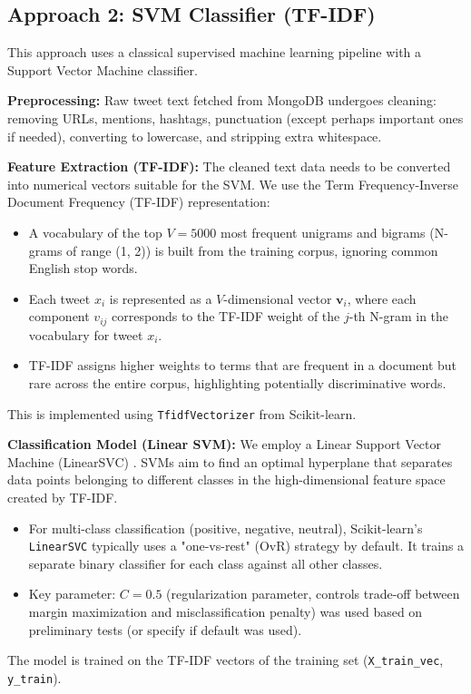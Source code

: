 \documentclass[10pt,twocolumn]{article}
\begin{document}
\subsection{Approach 2: SVM Classifier (TF-IDF)}
\label{subsec:sol_svm}

This approach uses a classical supervised machine learning pipeline with a Support Vector Machine classifier.

\textbf{Preprocessing:} Raw tweet text fetched from MongoDB undergoes cleaning: removing URLs, mentions, hashtags, punctuation (except perhaps important ones if needed), converting to lowercase, and stripping extra whitespace.

\textbf{Feature Extraction (TF-IDF):} The cleaned text data needs to be converted into numerical vectors suitable for the SVM. We use the Term Frequency-Inverse Document Frequency (TF-IDF) representation:
\begin{itemize}[itemsep=0pt, topsep=3pt]
    \item A vocabulary of the top $V=5000$ most frequent unigrams and bigrams (N-grams of range (1, 2)) is built from the training corpus, ignoring common English stop words.
    \item Each tweet $x_i$ is represented as a $V$-dimensional vector $\mathbf{v}_i$, where each component $v_{ij}$ corresponds to the TF-IDF weight of the $j$-th N-gram in the vocabulary for tweet $x_i$.
    \item TF-IDF assigns higher weights to terms that are frequent in a document but rare across the entire corpus, highlighting potentially discriminative words.
\end{itemize}
This is implemented using \texttt{TfidfVectorizer} from Scikit-learn.

\textbf{Classification Model (Linear SVM):} We employ a Linear Support Vector Machine (LinearSVC) \cite{ref:svm_cortes}. SVMs aim to find an optimal hyperplane that separates data points belonging to different classes in the high-dimensional feature space created by TF-IDF.
\begin{itemize}[itemsep=0pt, topsep=3pt]
    \item For multi-class classification (positive, negative, neutral), Scikit-learn's \texttt{LinearSVC} typically uses a "one-vs-rest" (OvR) strategy by default. It trains a separate binary classifier for each class against all other classes.
    \item Key parameter: $C=0.5$ (regularization parameter, controls trade-off between margin maximization and misclassification penalty) was used based on preliminary tests (or specify if default was used).
\end{itemize}
The model is trained on the TF-IDF vectors of the training set (\texttt{X\_train\_vec}, \texttt{y\_train}). %
\end{document}
